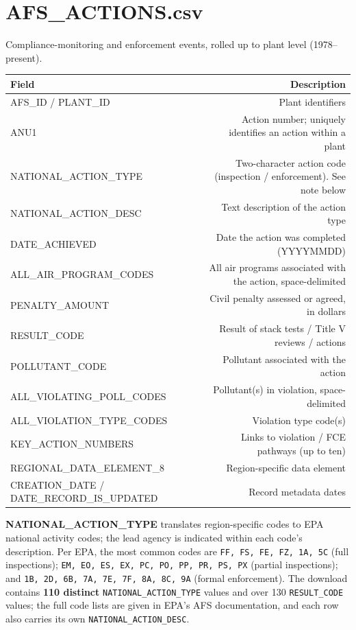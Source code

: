 \documentclass[11pt]{article}
\begin{document}
\section*{AFS\_ACTIONS.csv}
Compliance-monitoring and enforcement events, rolled up to plant level (1978--present).
\begin{longtable}{F D}
\toprule
Field & Description \\ \midrule \endhead
AFS\_ID / PLANT\_ID & Plant identifiers \\
ANU1 & Action number; uniquely identifies an action within a plant \\
NATIONAL\_ACTION\_TYPE & Two-character action code (inspection / enforcement). See note below \\
NATIONAL\_ACTION\_DESC & Text description of the action type \\
DATE\_ACHIEVED & Date the action was completed (YYYYMMDD) \\
ALL\_AIR\_PROGRAM\_CODES & All air programs associated with the action, space-delimited \\
PENALTY\_AMOUNT & Civil penalty assessed or agreed, in dollars \\
RESULT\_CODE & Result of stack tests / Title V reviews / actions \\
POLLUTANT\_CODE & Pollutant associated with the action \\
ALL\_VIOLATING\_POLL\_CODES & Pollutant(s) in violation, space-delimited \\
ALL\_VIOLATION\_TYPE\_CODES & Violation type code(s) \\
KEY\_ACTION\_NUMBERS & Links to violation / FCE pathways (up to ten) \\
REGIONAL\_DATA\_ELEMENT\_8 & Region-specific data element \\
CREATION\_DATE / DATE\_RECORD\_IS\_UPDATED & Record metadata dates \\
\bottomrule
\end{longtable}
\noindent\textbf{NATIONAL\_ACTION\_TYPE} translates region-specific codes to EPA national activity codes;
the lead agency is indicated within each code's description. Per EPA, the most common codes are
\texttt{FF, FS, FE, FZ, 1A, 5C} (full inspections); \texttt{EM, EO, ES, EX, PC, PO, PP, PR, PS, PX}
(partial inspections); and \texttt{1B, 2D, 6B, 7A, 7E, 7F, 8A, 8C, 9A} (formal enforcement). The download
contains \textbf{110 distinct} \texttt{NATIONAL\_ACTION\_TYPE} values and over 130 \texttt{RESULT\_CODE}
values; the full code lists are given in EPA's AFS documentation, and each row also carries its own
\texttt{NATIONAL\_ACTION\_DESC}.
\end{document}
